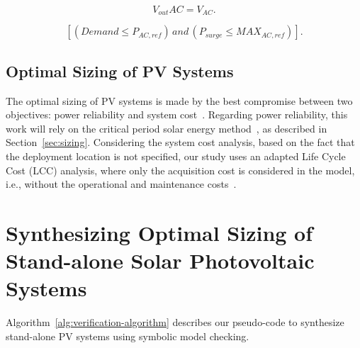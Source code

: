 \documentclass[runningheads]{llncs}
\begin{document}
\begin{equation}
\label{eq:voutac} 
V_{out}AC = V_{AC}.
\end{equation}

\begin{equation}
\label{eq:invcheck} 
\left[ (Demand \leq P_{AC,ref}) \, and \, (P_{surge} \leq MAX_{AC,ref}) \right].
\end{equation}

\subsection{Optimal Sizing of PV Systems}
%
The optimal sizing of PV systems is made by the best compromise between two objectives: power reliability and system cost~\cite{Alsadi2018}. 
Regarding power reliability, this work will rely on the critical period solar energy method~\cite{Pinho}, as described in Section~\ref{sec:sizing}. 
Considering the system cost analysis, based on the fact that the deployment location is not specified, our study uses an adapted Life Cycle Cost (LCC) analysis, where only the acquisition cost is considered in the model, i.e., without the operational and maintenance costs~\cite{Alsadi2018}.

\section{Synthesizing Optimal Sizing of Stand-alone Solar Photovoltaic Systems}
Algorithm~\ref{alg:verification-algorithm} describes our pseudo-code to synthesize stand-alone PV systems using symbolic model checking. 
\end{document}
